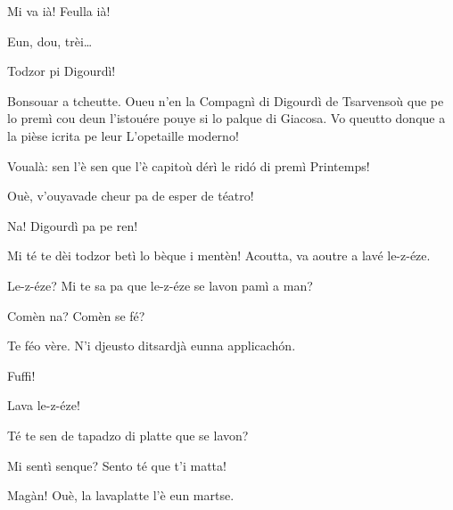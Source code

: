 \begin{drama}
\Tcheuttespeaks {} Mi va ià! Feulla ià!


\Joelspeaks Eun, dou, trèi\ldots

\Tcheuttespeaks{} Todzor pi Digourdì!



\Joelspeaks Bonsouar a tcheutte. Oueu n'en la Compagnì di Digourdì de Tsarvensoù que pe lo premì cou deun l'istouére pouye si lo palque di Giacosa. Vo queutto donque a la pièse icrita pe leur \og L'opetaille moderno\fg{}!



\Maganspeaks Voualà: sen l'è sen que l'è capitoù dérì le rid\'o di premì Printemps!

\Nevaouspeaks{} Ouè, v'ouyavade cheur pa de esper de téatro!

\Maganspeaks Na! Digourdì pa pe ren!

\Paganspeaks{}  Mi té te dèi todzor betì lo bèque i mentèn! Acoutta, va aoutre a lavé le-z-éze.

\Maganspeaks Le-z-éze? Mi te sa pa que le-z-éze se lavon pamì a man?

\Paganspeaks Comèn na? Comèn se fé?

\Maganspeaks Te féo vère.  N'i djeusto di\-tsardjà eunna applicach\'on.


\Maganspeaks{} Fuffi!


\Maganspeaks{} Lava le-z-éze!


\Maganspeaks{} Té te sen de tapadzo di platte que se lavon?

\Paganspeaks Mi sentì senque? Sento té que t'i matta!

\Nevaousaspeaks Magàn! Ouè, la lavaplatte l'è eun martse.


\end{drama}
